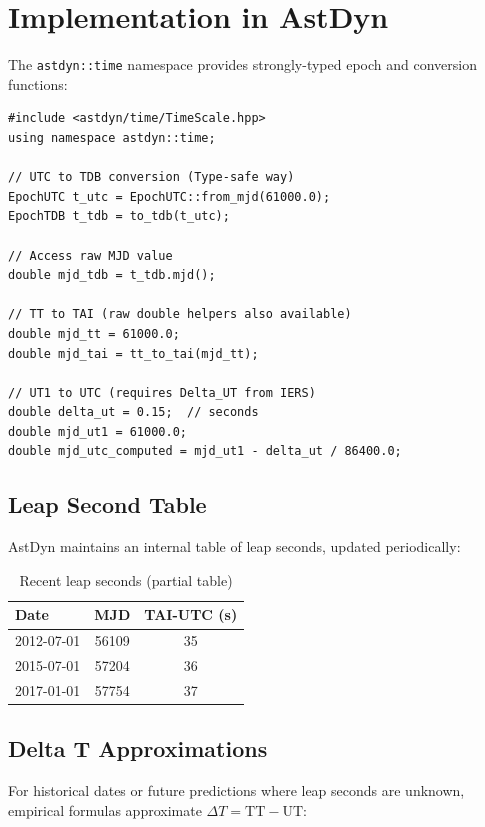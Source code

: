 \section{Implementation in AstDyn}
 
The \texttt{astdyn::time} namespace provides strongly-typed epoch and conversion functions:
 
\begin{lstlisting}[style=cpp,caption={Time scale conversions}]
#include <astdyn/time/TimeScale.hpp>
using namespace astdyn::time;

// UTC to TDB conversion (Type-safe way)
EpochUTC t_utc = EpochUTC::from_mjd(61000.0);
EpochTDB t_tdb = to_tdb(t_utc);

// Access raw MJD value
double mjd_tdb = t_tdb.mjd();

// TT to TAI (raw double helpers also available)
double mjd_tt = 61000.0;
double mjd_tai = tt_to_tai(mjd_tt);

// UT1 to UTC (requires Delta_UT from IERS)
double delta_ut = 0.15;  // seconds
double mjd_ut1 = 61000.0;
double mjd_utc_computed = mjd_ut1 - delta_ut / 86400.0;
\end{lstlisting}

\subsection{Leap Second Table}

AstDyn maintains an internal table of leap seconds, updated periodically:

\begin{table}[H]
\centering
\caption{Recent leap seconds (partial table)}
\label{tab:leapseconds}
\begin{tabular}{@{}lcc@{}}
\toprule
\textbf{Date} & \textbf{MJD} & \textbf{TAI-UTC (s)} \\
\midrule
2012-07-01 & 56109 & 35 \\
2015-07-01 & 57204 & 36 \\
2017-01-01 & 57754 & 37 \\
\bottomrule
\end{tabular}
\end{table}

\subsection{Delta T Approximations}

For historical dates or future predictions where leap seconds are unknown, empirical formulas approximate $\Delta T = \text{TT} - \text{UT}$:


